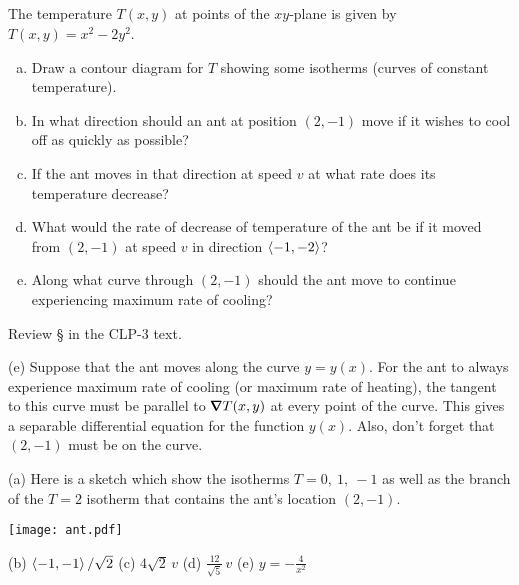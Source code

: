 \subsection*{\Application}

\begin{question}
The temperature $T(x,y)$ at points of the $xy$-plane is given by 
$T(x,y)=x^2-2y^2$.
\begin{enumerate}[(a)]
\item
Draw a contour diagram for $T$ showing some isotherms (curves
of constant temperature).
\item
In what direction should an ant at position $(2,-1)$ move if
it wishes to cool off as quickly as possible?
\item
If the ant moves in that direction at speed $v$ at what rate
does its temperature decrease?
\item
What would the rate of decrease of temperature of the ant be
if it moved from $(2,-1)$ at speed $v$ in direction $\left< -1,-2\right>$?
\item
Along what curve through $(2,-1)$ should the ant move to continue
experiencing maximum rate of cooling?
\end{enumerate}
\end{question}

\begin{hint}
Review \S{} in the CLP-3 text.

(e) Suppose that the ant moves along the curve $y=y(x)$. 
For the ant to always experience maximum rate of cooling (or maximum 
rate of heating), the tangent to this curve must be parallel to 
$\vnabla T(x,y)$ at every point of the curve. This gives a separable
differential equation for the function $y(x)$. Also, don't forget that $(2,-1)$ must be on the curve.
\end{hint}

\begin{answer}
(a) Here is a sketch which show the isotherms $T=0,\ 1,\ -1$ as well
as the branch of the $T=2$ isotherm that contains the ant's location
$(2,-1)$.
\begin{center}
     \texttt{[image: ant.pdf]}
\end{center}

(b) $\left< -1,-1\right>/\sqrt{2}$\qquad
(c) $4\sqrt{2}\,v$\qquad
(d) $\frac{12}{\sqrt{5}}\,v$\qquad
(e) $y=-\frac{4}{x^2}$
\end{answer}

